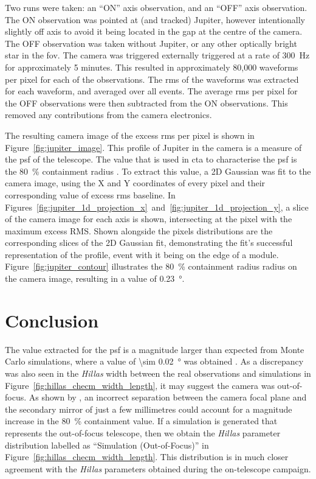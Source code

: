 Two runs were taken: an ``ON'' axis observation, and an ``OFF'' axis observation. The ON observation was pointed at (and tracked) Jupiter, however intentionally slightly off axis to avoid it being located in the gap at the centre of the camera. The OFF observation was taken without Jupiter, or any other optically bright star in the \gls{fov}. The camera was triggered externally triggered at a rate of \SI{300}{Hz} for approximately 5 minutes. This resulted in approximately 80,000 waveforms per pixel for each of the observations. The \gls{rms} of the waveforms was extracted for each waveform, and averaged over all events. The average \gls{rms} per pixel for the OFF observations were then subtracted from the ON observations. This removed any contributions from the camera electronics. 

The resulting camera image of the excess \gls{rms} per pixel is shown in Figure~\ref{fig:jupiter_image}. This profile of Jupiter in the camera is a measure of the \gls{psf} of the telescope. The value that is used in \gls{cta} to characterise the \gls{psf} is the \SI{80}{\percent} containment radius \cite{Armstrong2015,Rulten2016}. To extract this value, a 2D Gaussian was fit to the camera image, using the X and Y coordinates of every pixel and their corresponding value of excess \gls{rms} baseline. In Figures~\ref{fig:jupiter_1d_projection_x}~and~\ref{fig:jupiter_1d_projection_y}, a slice of the camera image for each axis is shown, intersecting at the pixel with the maximum excess RMS. Shown alongside the pixels distributions are the corresponding slices of the 2D Gaussian fit, demonstrating the fit's successful representation of the profile, event with it being on the edge of a module. Figure~\ref{fig:jupiter_contour} illustrates the \SI{80}{\percent} containment radius radius on the camera image, resulting in a value of \SI{0.23}{\degree}. 

\section{Conclusion}

The value extracted for the \gls{psf} is a magnitude larger than expected from Monte Carlo simulations, where a value of \SI{\sim 0.02}{\degree} was obtained \cite{Armstrong2015}. As a discrepancy was also seen in the \textit{Hillas} width between the real observations and simulations in Figure~\ref{fig:hillas_checm_width_length}, it may suggest the camera was out-of-focus. As shown by \textcite{Rulten2016}, an incorrect separation between the camera focal plane and the secondary mirror of just a few millimetres could account for a magnitude increase in the \SI{80}{\percent} containment value. If a simulation is generated that represents the out-of-focus telescope, then we obtain the \textit{Hillas} parameter distribution labelled as ``Simulation (Out-of-Focus)'' in Figure~\ref{fig:hillas_checm_width_length}. This distribution is in much closer agreement with the \textit{Hillas} parameters obtained during the on-telescope campaign. 


